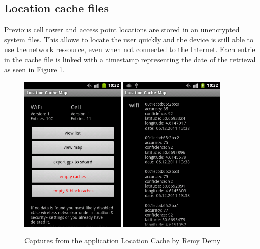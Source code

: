 \subsection{Location cache files}

Previous cell tower and access point locations are stored in an unencrypted system files.
This allows to locate the user quickly and the device is still able to use the network ressource, even when not connected to the Internet.
Each entrie in the cache file is linked with a timestamp representing the date of the retrieval as seen in Figure \ref{fig:locmap}.\\

\begin{figure}[h]
  \centering
  \includegraphics[width=5cm]{images/cache1.png}
  \includegraphics[width=5cm]{images/cache2.png}
  \caption{Captures from the application Location Cache by Remy Demy}
  \label{fig:locmap}
\end{figure}

